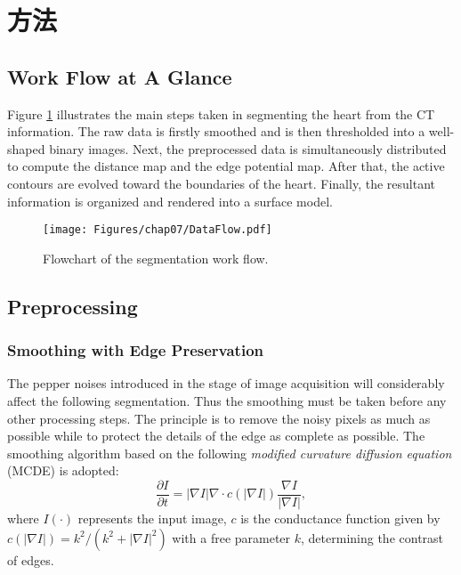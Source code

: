 \section{方法}
\label{sec7-2}

\subsection{Work Flow at A Glance}
\label{sec:overview}

Figure \ref{fig:DataFlow} illustrates the main steps taken in segmenting the heart from the CT information.
The raw data is firstly smoothed and is then thresholded into a well-shaped binary images.
Next, the preprocessed data is simultaneously distributed to compute the distance map and the edge potential map.
After that, the active contours are evolved toward the boundaries of the heart.
Finally, the resultant information is organized and rendered into a surface model.
\begin{figure}[t]
\centering
\texttt{[image: Figures/chap07/DataFlow.pdf]}
\caption{Flowchart of the segmentation work flow.}
\label{fig:DataFlow}
\end{figure}

\subsection{Preprocessing}
\label{sec:preprocessing}

\subsubsection{Smoothing with Edge Preservation}

The pepper noises introduced in the stage of image acquisition will considerably affect the following segmentation.
Thus the smoothing must be taken before any other processing steps.
The principle is to remove the noisy pixels as much as possible while to protect the details of the edge as complete as possible.
The smoothing algorithm based on the following \emph{modified curvature diffusion equation} (MCDE) \cite{Whitaker2001} is adopted:
\begin{equation}
\label{eqn:MCDE}
\frac{\partial I}{\partial t} = |\nabla I| \nabla \cdot c(|\nabla I|) \frac{\nabla I}{|\nabla I|},
\end{equation}
where $I(\cdot)$ represents the input image, $c$ is the conductance function given by $c(|\nabla I|) = k^2/(k^2 + |\nabla I|^2)$ with a free parameter $k$, determining the contrast of edges. %

